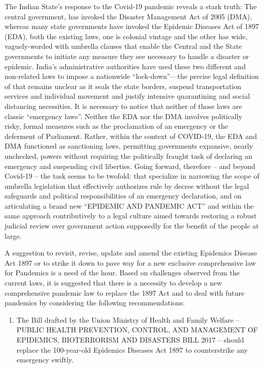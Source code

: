 \begin{multicols}{2}

\noi
The Indian State’s response to the Covid-19 pandemic reveals a stark truth: The central
government, has invoked the Disaster Management Act of 2005 (DMA), whereas many state
governments have invoked the Epidemic Diseases Act of 1897 (EDA), both the existing laws,
one is colonial vintage and the other has wide, vaguely-worded with umbrella clauses that
enable the Central and the State governments to initiate any measure they see necessary to
handle a disaster or epidemic. India’s administrative authorities have used these two different 
and non-related laws to impose a nationwide “lock-down”—the precise legal definition of
that remains unclear as it seals the state borders, suspend transportation services and
individual movement and justify intensive quarantining and social distancing necessities.
It is necessary to notice that neither of those laws are classic “emergency laws”. Neither the
EDA nor the DMA involves politically risky, formal measures such as the proclamation of an
emergency or the deferment of Parliament. Rather, within the context of COVID-19, the
EDA and DMA functioned as sanctioning laws, permitting governments expansive, nearly
unchecked, powers without requiring the politically fraught task of declaring an emergency
and suspending civil liberties. Going forward, therefore – and beyond Covid-19 – the task
seems to be twofold: that specialize in narrowing the scope of umbrella legislation that
effectively authorizes rule by decree without the legal safeguards and political responsibilities
of an emergency declaration, and on articulating a brand new “EPIDEMIC AND
PANDEMIC ACT” and within the same approach contributively to a legal culture aimed
towards restoring a robust judicial review over government action supposedly for the benefit
of the people at large.


\noi
A suggestion to revisit, revise, update and amend the existing Epidemics Disease Act 1897 or
to strike it down to pave way for a new exclusive comprehensive law for Pandemics is a need
of the hour. Based on challenges observed from the current laws, it is suggested that there is a
necessity to develop a new comprehensive pandemic law to replace the 1897 Act and to deal
with future pandemics by considering the following recommendations:

\begin{enumerate}[label=$\bullet$]
\item The Bill drafted by the Union Ministry of Health and Family Welfare – PUBLIC HEALTH PREVENTION, CONTROL, AND MANAGEMENT OF EPIDEMICS, BIOTERRORISM AND DISASTERS BILL 2017 – should replace the 100-year-old Epidemics Diseases Act 1897 to counterstrike any emergency swiftly.


\end{enumerate}
\end{multicols}
